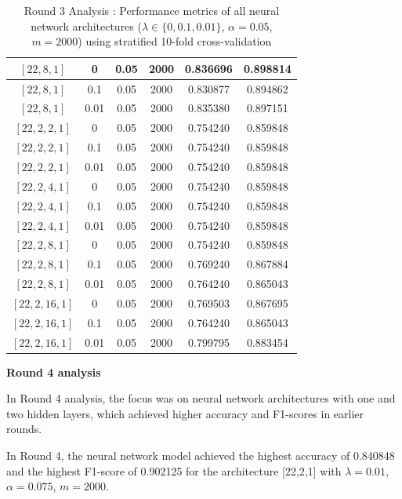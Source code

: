 \documentclass{article}
\begin{document}
\begin{enumerate}
\begin{table}[H]
\begin{tabular}{|c|c|c|c|c|c|}
$[22,8,1]$ & 0    & 0.05 & 2000 & 0.836696 & 0.898814 \\ \hline
$[22,8,1]$ & 0.1  & 0.05 & 2000 & 0.830877 & 0.894862 \\ \hline
$[22,8,1]$ & 0.01 & 0.05 & 2000 & 0.835380 & 0.897151 \\ \hline

$[22,2,2,1]$ & 0    & 0.05 & 2000 & 0.754240 & 0.859848 \\ \hline
$[22,2,2,1]$ & 0.1  & 0.05 & 2000 & 0.754240 & 0.859848 \\ \hline
$[22,2,2,1]$ & 0.01 & 0.05 & 2000 & 0.754240 & 0.859848 \\ \hline

$[22,2,4,1]$ & 0    & 0.05 & 2000 & 0.754240 & 0.859848 \\ \hline
$[22,2,4,1]$ & 0.1  & 0.05 & 2000 & 0.754240 & 0.859848 \\ \hline
$[22,2,4,1]$ & 0.01 & 0.05 & 2000 & 0.754240 & 0.859848 \\ \hline

$[22,2,8,1]$ & 0    & 0.05 & 2000 & 0.754240 & 0.859848 \\ \hline
$[22,2,8,1]$ & 0.1  & 0.05 & 2000 & 0.769240 & 0.867884 \\ \hline
$[22,2,8,1]$ & 0.01 & 0.05 & 2000 & 0.764240 & 0.865043 \\ \hline

$[22,2,16,1]$ & 0    & 0.05 & 2000 & 0.769503 & 0.867695 \\ \hline
$[22,2,16,1]$ & 0.1  & 0.05 & 2000 & 0.764240 & 0.865043 \\ \hline
$[22,2,16,1]$ & 0.01 & 0.05 & 2000 & 0.799795 & 0.883454 \\ \hline

\end{tabular}

\caption{Round 3 Analysis : Performance metrics of all neural network architectures ($\lambda \in \{0, 0.1, 0.01\}$, $\alpha = 0.05$, $m = 2000$) using stratified 10-fold cross-validation}
\end{table}


\textbf{Round 4 analysis}

In Round 4 analysis, the focus was on neural network architectures with one and two hidden layers, which achieved higher accuracy and F1-scores in earlier rounds.

In Round 4, the neural network model achieved the highest accuracy of 0.840848 and the highest F1-score of 0.902125 for the architecture [22,2,1] with $\lambda = 0.01$, $\alpha = 0.075$, $m = 2000$. \\


\end{enumerate}
\end{document}
